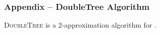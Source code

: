\documentclass{beamer} %
\newenvironment{proofIdea}{%
  \renewcommand{\proofname}{Proof Idea}\renewcommand{\qedsymbol}{}\proof}{\endproof}
\begin{document}
\begin{frame}
  \frametitle{Appendix -- DoubleTree Algorithm}

  \begin{theorem}
    \textsc{DoubleTree} is a 2-approximation algorithm for \mTSP{}.
  \end{theorem}

  \begin{columns}[T] %
    \begin{column}{.35\textwidth}
      \begin{figure}

\end{figure}
\end{column}
\end{columns}
\end{frame}
\end{document}
